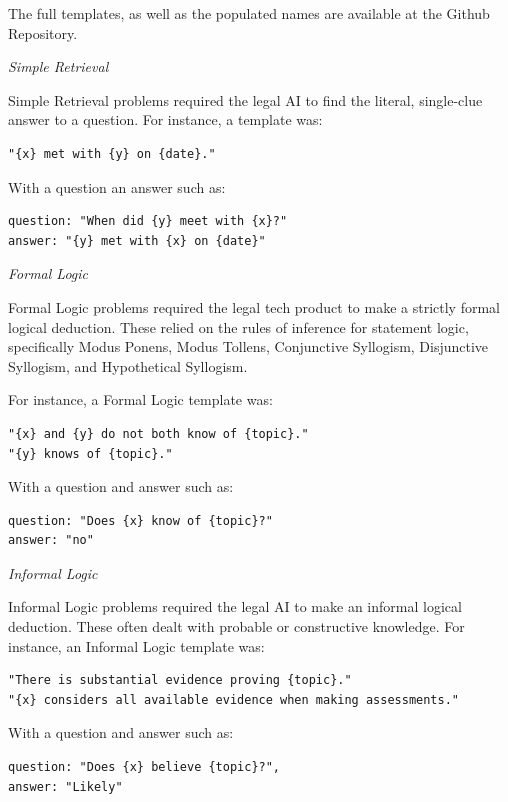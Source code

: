 \documentclass[
]{article}
\begin{document}
The full templates, as well as the populated names are available at the
Github Repository.

\emph{Simple Retrieval}

Simple Retrieval problems required the legal AI to find the literal,
single-clue answer to a question. For instance, a template was:

\begin{verbatim}
"{x} met with {y} on {date}."
\end{verbatim}

With a question an answer such as:

\begin{verbatim}
question: "When did {y} meet with {x}?"
answer: "{y} met with {x} on {date}"
\end{verbatim}

\emph{Formal Logic}

Formal Logic problems required the legal tech product to make a strictly
formal logical deduction. These relied on the rules of inference for
statement logic, specifically Modus Ponens, Modus Tollens, Conjunctive
Syllogism, Disjunctive Syllogism, and Hypothetical Syllogism.

For instance, a Formal Logic template was:

\begin{verbatim}
"{x} and {y} do not both know of {topic}."
"{y} knows of {topic}."
\end{verbatim}

With a question and answer such as:

\begin{verbatim}
question: "Does {x} know of {topic}?"
answer: "no"
\end{verbatim}

\emph{Informal Logic}

Informal Logic problems required the legal AI to make an informal
logical deduction. These often dealt with probable or constructive
knowledge. For instance, an Informal Logic template was:

\begin{verbatim}
"There is substantial evidence proving {topic}."
"{x} considers all available evidence when making assessments."
\end{verbatim}

With a question and answer such as:

\begin{verbatim}
question: "Does {x} believe {topic}?",
answer: "Likely"
\end{verbatim}
\end{document}
